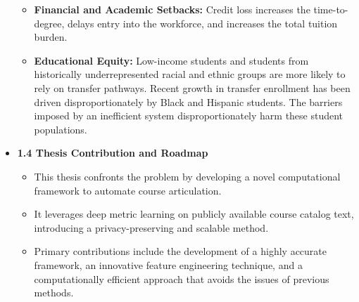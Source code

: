 \documentclass[11pt]{article}
\begin{document}
\begin{itemize}
\begin{itemize}
        \item \textbf{Financial and Academic Setbacks:} Credit loss increases the time-to-degree, delays entry into the workforce, and increases the total tuition burden.
        \item \textbf{Educational Equity:} Low-income students and students from historically underrepresented racial and ethnic groups are more likely to rely on transfer pathways. Recent growth in transfer enrollment has been driven disproportionately by Black and Hispanic students. The barriers imposed by an inefficient system disproportionately harm these student populations.
    \end{itemize}
    \item \textbf{1.4 Thesis Contribution and Roadmap}
    \begin{itemize}
        \item This thesis confronts the problem by developing a novel computational framework to automate course articulation.
        \item It leverages deep metric learning on publicly available course catalog text, introducing a privacy-preserving and scalable method.
        \item Primary contributions include the development of a highly accurate framework, an innovative feature engineering technique, and a computationally efficient approach that avoids the issues of previous methods.
    \end{itemize}
\end{itemize}
\end{document}
